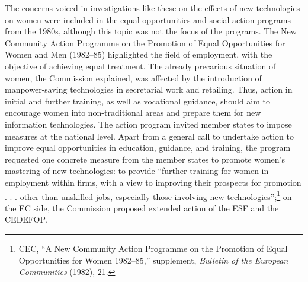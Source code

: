 \documentclass{tufte-handout}
\begin{document}
The concerns voiced in investigations like these on the effects of new
technologies on women were included in the equal opportunities and
social action programs from the 1980s, although this topic was not the
focus of the programs. The New Community Action Programme on the
Promotion of Equal Opportunities for Women and Men (1982--85)
highlighted the field of employment, with the objective of achieving
equal treatment. The already precarious situation of women, the
Commission explained, was affected by the introduction of
manpower-saving technologies in secretarial work and retailing. Thus,
action in initial and further training, as well as vocational guidance,
should aim to encourage women into non-traditional areas and prepare
them for new information technologies. The action program invited member
states to impose measures at the national level. Apart from a general
call to undertake action to improve equal opportunities in education,
guidance, and training, the program requested one concrete measure from
the member states to promote women's mastering of new technologies: to
provide ``further training for women in employment within firms, with a
view to improving their prospects for promotion . . . other than
unskilled jobs, especially those involving new
technologies'';\footnote{CEC, ``A New Community Action Programme on the
  Promotion of Equal Opportunities for Women 1982--85,'' supplement,
  \emph{Bulletin of the European Communities} (1982), 21.} on the EC
side, the Commission proposed extended action of the ESF and the
CEDEFOP.
\end{document}
